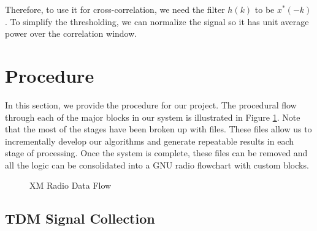 \documentclass[conference,onecolumn]{IEEEtran}
\begin{document}
\noindent Therefore, to use it for cross-correlation, we need the filter $h(k)$ to be $x^*(-k)$. To simplify the thresholding, we can normalize the signal so it has unit average power over the correlation window.

\section{Procedure}

In this section, we provide the procedure for our project. The procedural flow through each of the major blocks in our system is illustrated in Figure \ref{fig::xm_radio_processing}. Note that the most of the stages have been broken up with files. These files allow us to incrementally develop our algorithms and generate repeatable results in each stage of processing. Once the system is complete, these files can be removed and all the logic can be consolidated into a GNU radio flowchart with custom blocks.

\begin{figure}[H]
	\centerline{}
	\caption{XM Radio Data Flow}
	\label{fig::xm_radio_processing}
\end{figure}

\subsection{TDM Signal Collection}
\end{document}
